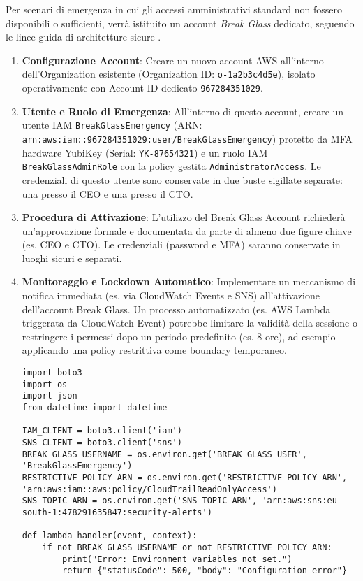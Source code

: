 Per scenari di emergenza in cui gli accessi amministrativi standard non fossero disponibili o sufficienti, verrà istituito un account \emph{Break Glass} dedicato, seguendo le linee guida di architetture sicure \cite{saraswat:breakglass}.
\begin{enumerate}
    \item \textbf{Configurazione Account}: Creare un nuovo account AWS all'interno dell'Organization esistente (Organization ID: \texttt{o-1a2b3c4d5e}), isolato operativamente con Account ID dedicato \texttt{967284351029}.
    \item \textbf{Utente e Ruolo di Emergenza}: All'interno di questo account, creare un utente IAM \texttt{BreakGlassEmergency} (ARN: \texttt{arn:aws:iam::967284351029:user/BreakGlassEmergency}) protetto da MFA hardware YubiKey (Serial: \texttt{YK-87654321}) e un ruolo IAM \texttt{BreakGlassAdminRole} con la policy gestita \texttt{AdministratorAccess}. Le credenziali di questo utente sono conservate in due buste sigillate separate: una presso il CEO e una presso il CTO.
    \item \textbf{Procedura di Attivazione}: L'utilizzo del Break Glass Account richiederà un'approvazione formale e documentata da parte di almeno due figure chiave (es. CEO e CTO). Le credenziali (password e MFA) saranno conservate in luoghi sicuri e separati.
    \item \textbf{Monitoraggio e Lockdown Automatico}: Implementare un meccanismo di notifica immediata (es. via CloudWatch Events e SNS) all'attivazione dell'account Break Glass. Un processo automatizzato (es. AWS Lambda triggerata da CloudWatch Event) potrebbe limitare la validità della sessione o restringere i permessi dopo un periodo predefinito (es. 8 ore), ad esempio applicando una policy restrittiva come boundary temporaneo.
    \begin{lstlisting}[style=python, caption={Esempio Lambda per limitare utente Break Glass (concettuale)}, label=lst:breakglass-lambda]
import boto3
import os
import json
from datetime import datetime

IAM_CLIENT = boto3.client('iam')
SNS_CLIENT = boto3.client('sns')
BREAK_GLASS_USERNAME = os.environ.get('BREAK_GLASS_USER', 'BreakGlassEmergency')
RESTRICTIVE_POLICY_ARN = os.environ.get('RESTRICTIVE_POLICY_ARN', 'arn:aws:iam::aws:policy/CloudTrailReadOnlyAccess')
SNS_TOPIC_ARN = os.environ.get('SNS_TOPIC_ARN', 'arn:aws:sns:eu-south-1:478291635847:security-alerts')

def lambda_handler(event, context):
    if not BREAK_GLASS_USERNAME or not RESTRICTIVE_POLICY_ARN:
        print("Error: Environment variables not set.")
        return {"statusCode": 500, "body": "Configuration error"}


\end{lstlisting}
\end{enumerate}
